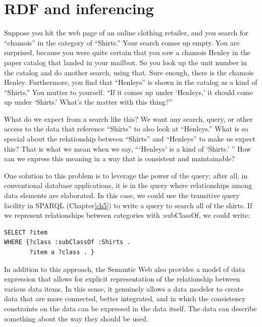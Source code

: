 \chapter{RDF and inferencing}
\label{ch7}

Suppose you hit the web page of an online clothing retailer, and you
search for ``chamois'' in the category of ``Shirts.'' Your search comes
up empty. You are surprised, because you were quite certain that you saw
a chamois Henley in the paper catalog that landed in your mailbox. So
you look up the unit number in the catalog and do another search, using
that. Sure enough, there is the chamois Henley. Furthermore, you find
that ``Henleys'' is shown in the catalog as a kind of ``Shirts.'' You
mutter to yourself. ``If it comes up under `Henleys,' it should come up
under `Shirts.' What's the matter with this thing?''

What do we expect from a search like this? We want any search, query, or
other access to the data that reference ``Shirts'' to also look at
``Henleys.'' What is so special about the relationship between
``Shirts'' and ``Henleys'' to make us expect this? That is what we mean
when we say, ```Henleys' is a kind of `Shirts.' '' How can we express
this meaning in a way that is consistent and maintainable?

One solution to this problem is to leverage the power of the query;
after all, in conventional database applications, it is in the query
where relationships among data elements are elaborated. In this case, we
could use the transitive query facility in SPARQL (Chapter\ref{ch5}) to write a
query to search all of the shirts. If we represent relationships between
categories with :subClassOf, we could write:

\begin{lstlisting}
SELECT ?item
WHERE {?class :subClassOf :Shirts .
       ?item a ?class . }
\end{lstlisting}


In addition to this approach, the Semantic Web also provides a model of
data expression that allows for explicit representation of the
relationship between various data items. In this sense, it genuinely
allows a data modeler to create data that are more connected, better
integrated, and in which the consistency constraints on the data can be
expressed in the data itself. The data can describe something about the
way they should be used.

